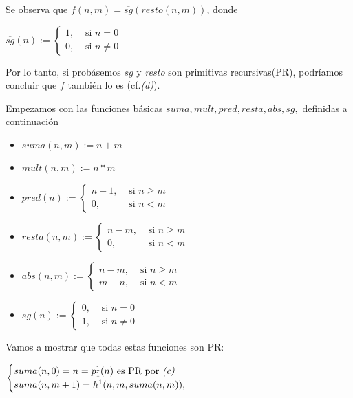 \documentclass[a4paper,12pt]{article}
\begin{document}
\newpage
Se observa que $f(n,m) = \overline{sg}(resto(n,m))$, donde


$\overline{sg}(n):=
\begin{cases}
1, & \text{ si } n = 0 \\
0, & \text{ si } n \neq 0
\end{cases}
$


Por lo tanto, si probásemos $\overline{sg}$ y \textit{resto} son primitivas recursivas(PR), podríamos concluir que $f$ también lo es (cf.\textit{(d)}).

Empezamos con las funciones básicas $suma,mult,pred,resta,abs,sg,$ definidas a continuación
\begin{itemize}
    \item $suma(n, m):=n+m$
    
    \item $mult(n, m):=n * m$
    
    \item $pred(n):= 
    \begin{cases}n-1, & \text { si } n \geq m \\
    0, & \text { si } n<m
    \end{cases}$
    
    \item $resta(n, m):= 
    \begin{cases}n-m, & \text { si } n \geq m \\
    0, & \text { si } n<m
    \end{cases}$
    
    \item $abs(n, m):= 
    \begin{cases}n-m, & \text { si } n \geq m \\
    m-n, & \text { si } n<m
    \end{cases}$
    
    \item $s g(n):= 
    \begin{cases}0, & \text { si } n=0 \\
    1, & \text { si } n \neq 0
    \end{cases}$
    
\end{itemize}

Vamos a mostrar que todas estas funciones son PR:

$\begin{cases}suma(n,0)=n=p^{1}_{1}(n) \text{ es PR por \textit{(c)}} \\
suma(n,m + 1) = h^{1}(n,m,suma(n,m)),
\end{cases}$
\end{document}
